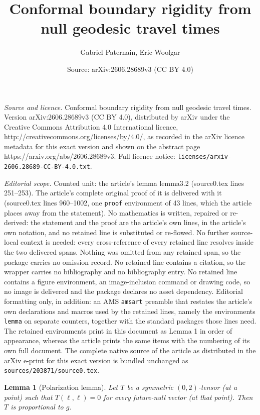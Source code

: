 \documentclass[10pt,a4paper]{amsart}
\title{Conformal boundary rigidity from null geodesic travel times}
\author{Gabriel Paternain, Eric Woolgar}
\date{Source: arXiv:2606.28689v3 (CC BY 4.0)}
\newtheorem{lemma}{Lemma}
\begin{document}
\maketitle

\noindent\emph{Source and licence.} Conformal boundary rigidity from null geodesic travel times. Version arXiv:2606.28689v3 (CC BY 4.0), distributed by arXiv under the Creative Commons Attribution 4.0 International licence, http://creativecommons.org/licenses/by/4.0/, as recorded in the arXiv licence metadata for this exact version and shown on the abstract page https://arxiv.org/abs/2606.28689v3. Full licence notice: \texttt{licenses/arxiv-2606.28689-CC-BY-4.0.txt}.\par\smallskip

\noindent\textit{Editorial scope.} Counted unit: the article's lemma lemma3.2 (source0.tex lines 251--253). The article's complete original proof of it is delivered with it (source0.tex lines 960--1002, one \texttt{proof} environment of 43 lines, which the article places away from the statement). No mathematics is written, repaired or re-derived: the statement and the proof are the article's own lines, in the article's own notation, and no retained line is substituted or re-flowed.  No further source-local context is needed: every cross-reference of every retained line resolves inside the two delivered spans.  Nothing was omitted from any retained span, so the package carries no omission record.  No retained line contains a citation, so the wrapper carries no bibliography and no bibliography entry.  No retained line contains a figure environment, an image-inclusion command or drawing code, so no image is delivered and the package declares no asset dependency.  Editorial formatting only, in addition: an AMS \texttt{amsart} preamble that restates the article's own declarations and macros used by the retained lines, namely the environments \texttt{lemma} on separate counters, together with the standard packages those lines need.  The retained environments print in this document as Lemma 1 in order of appearance, whereas the article prints the same items with the numbering of its own full document.  The complete native source of the article as distributed in the arXiv e-print for this exact version is bundled unchanged as \texttt{sources/203871/source0.tex}.
\begin{lemma}[Polarization lemma]\label{lemma3.2}
Let $T$ be a symmetric $(0,2)$-tensor (at a point) such that $T(\ell,\ell)=0$ for every future-null vector (at that point). Then $T$ is proportional to $g$.
\end{lemma}
\end{document}
